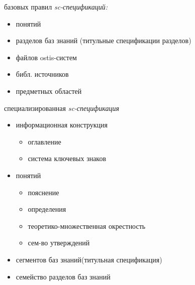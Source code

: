 \begin{SCn}
{\begin{scnitemize}
	\item базовых правил \textit{sc-спецификаций:}
	\begin{itemize}
		\item понятий 
		\item разделов баз знаний (титульные спецификации разделов)
		\item файлов ostis-систем
		\item библ. источников
		\item предметных областей 	
	\end{itemize}
	\item специализированная \textit{sc-спецификация}
	\begin{itemize}
		\item информационная конструкция
		\begin{itemize}
			\item оглавление
			\item система ключевых знаков	
		\end{itemize}
	\end{itemize}
	\begin{itemize}
		\item понятий
		\begin{itemize}
			\item пояснение
			\item определения
			\item теоретико-множественная окрестность
			\item сем-во утверждений	
		\end{itemize}
	\end{itemize}
	\begin{itemize}
		\item сегментов баз знаний(титульная спецификация)
		\item семейство разделов баз знаний	
	\end{itemize}
\end{scnitemize}}

\scniselement{\scnstartsetlocal\scnendstructlocal}


\end{SCn}
